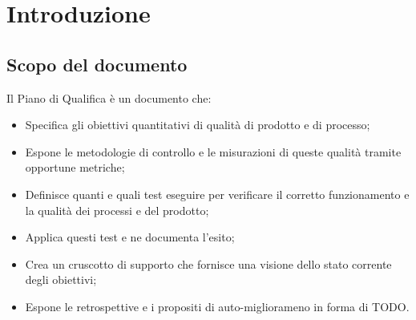\chapter{Introduzione}
\section{Scopo del documento}
Il Piano di Qualifica è un documento che: 
\begin{itemize}
    \item Specifica gli obiettivi 
    quantitativi di qualità di prodotto e di processo;
    \item Espone le
    metodologie di controllo e le misurazioni di queste qualità tramite 
    opportune metriche;
    \item Definisce quanti e quali test eseguire per verificare il corretto funzionamento
    e la qualità dei processi e del prodotto;
    \item Applica questi test e ne documenta l'esito;
    \item Crea un cruscotto di supporto che fornisce
    una visione dello stato corrente degli obiettivi;
    \item Espone le retrospettive e i propositi di auto-migliorameno
    in forma di TODO.
\end{itemize}
